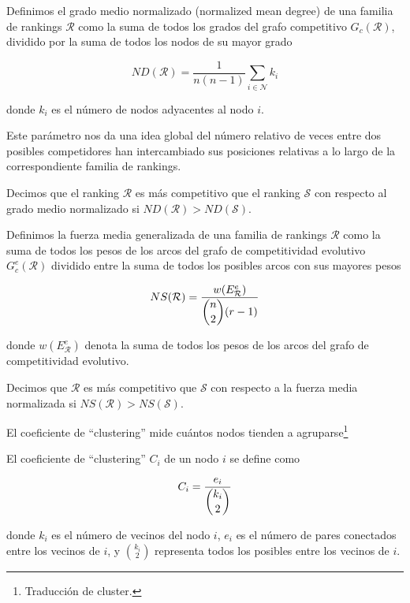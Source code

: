 \begin{defi}
Definimos el grado medio normalizado (normalized mean degree) de una familia de rankings $\mathcal{R}$ como la suma de todos los grados del grafo competitivo $G_c(\mathcal{R})$, dividido por la suma de todos los nodos de su mayor grado

\[ND(\mathcal{R}) = \dfrac{1}{n(n-1)} \sum_{i \in \mathcal{N}} k_i\]

donde $k_i$ es el número de nodos adyacentes al nodo $i$.
\end{defi}

\begin{ob}
Este parámetro nos da una idea global del número relativo de veces entre dos posibles competidores han intercambiado sus posiciones relativas a lo largo de la correspondiente familia de rankings.
\end{ob}

\begin{defi}
Decimos que el ranking $\mathcal{R}$ es más competitivo que el ranking $\mathcal{S}$ con respecto al grado medio normalizado si $ND(\mathcal{R}) > ND(\mathcal{S})$.
\end{defi}

\begin{defi}
Definimos la fuerza media generalizada de una familia de rankings $\mathcal{R}$ como la suma de todos los pesos de los arcos del grafo de competitividad evolutivo $G_c^e(\mathcal{R})$ dividido entre la suma de todos los posibles arcos con sus mayores pesos

\[ NS(\mathcal{R}) = \dfrac{w(E_\mathcal{R}^e)}{\dbinom{n}{2}(r-1)} \]

donde  $w(E_\mathcal{R}^e)$ denota la suma de todos los pesos de los arcos del grafo de competitividad evolutivo.
\end{defi}

\begin{defi}
Decimos que $\mathcal{R}$ es más competitivo que $\mathcal{S}$ con respecto a la fuerza media normalizada si $NS(\mathcal{R}) > NS(\mathcal{S})$.
\end{defi}

\begin{nota}
El coeficiente de ``clustering'' mide cuántos nodos tienden a agruparse\footnote{Traducción de cluster.}
\end{nota}

\begin{defi}
El coeficiente de ``clustering'' $C_i$ de un nodo $i$ se define como

\[ C_i = \dfrac{e_i}{\dbinom{k_i}{2}} \]

donde $k_i$ es el número de vecinos del nodo $i$, $e_i$ es el número de pares conectados entre los vecinos de $i$, y $\binom{k_i}{2}$ representa todos los posibles entre los vecinos de $i$.
\end{defi}

